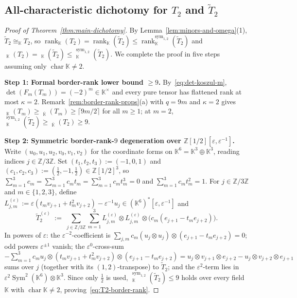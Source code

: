 \documentclass[11pt,reqno]{amsart}
\theoremstyle{definition}
\theoremstyle{remark}
\numberwithin{equation}{section}
\newcommand{\KK}{\mathbb{K}}
\newcommand{\ZZ}{\mathbb{Z}}
\DeclareMathOperator{\rk}{rank}
\DeclareMathOperator{\brk}{\underline{rank}}
\DeclareMathOperator{\Sym}{Sym}
\DeclareMathOperator{\chr}{char}
\begin{document}
\subsection{All-characteristic dichotomy for \texorpdfstring{$T_2$}{T2} and \texorpdfstring{$\widetilde{T}_2$}{T2-tilde}}

\begin{proof}[Proof of Theorem~\ref{thm:main-dichotomy}]
By Lemma~\ref{lem:minors-and-omega}(1), $\widetilde{T}_2 \cong_{\KK} T_2$, so $\rk_{\KK}(T_2) = \rk_{\KK}(\widetilde{T}_2) \le \rk_{\KK}^{\mathrm{sym}_{1,2}}(\widetilde{T}_2)$ and $\brk_{\KK}(T_2) = \brk_{\KK}(\widetilde{T}_2) \le \brk_{\KK}^{\mathrm{sym}_{1,2}}(\widetilde{T}_2)$. We complete the proof in five steps assuming only $\chr\KK \neq 2$.

\medskip
\noindent\textbf{Step 1: Formal border-rank lower bound $\ge 9$.}
By~\eqref{eq:det-koszul-m}, $\det(F_m(T_m)) = (-2)^m \in \KK^\times$ and every pure tensor has flattened rank at most $\kappa = 2$. Remark~\ref{rem:border-rank-props}(a) with $q = 9m$ and $\kappa = 2$ gives $\brk_{\KK}(T_m) \ge \brk_{\overline{\KK}}(T_m) \ge \lceil 9m/2 \rceil$ for all $m \ge 1$; at $m = 2$, $\brk_{\KK}^{\mathrm{sym}_{1,2}}(\widetilde{T}_2) \ge \brk_{\overline{\KK}}(T_2) \ge 9$.

\medskip
\noindent\textbf{Step 2: Symmetric border-rank-$9$ degeneration over $\ZZ[1/2][\varepsilon, \varepsilon^{-1}]$.}
Write $(u_0, u_1, u_2, v_0, v_1, v_2)$ for the coordinate forms on $\KK^6 = \KK^3 \oplus \KK^3$, reading indices $j \in \ZZ/3\ZZ$. Set $(t_1, t_2, t_3) := (-1, 0, 1)$ and $(c_1, c_2, c_3) := (\frac{1}{2}, -1, \frac{1}{2}) \in \ZZ[1/2]^3$, so $\sum_{m=1}^3 c_m = \sum_{m=1}^3 c_m t_m = \sum_{m=1}^3 c_m t_m^3 = 0$ and $\sum_{m=1}^3 c_m t_m^2 = 1$. For $j \in \ZZ/3\ZZ$ and $m \in \{1, 2, 3\}$, define $L_{j,m}^{(\varepsilon)} := \varepsilon(t_m v_{j+1} + t_m^2 v_{j+2}) - \varepsilon^{-1} u_j \in (\KK^6)^*[\varepsilon, \varepsilon^{-1}]$ and
\[
  \widetilde{T}_2^{(\varepsilon)} \;:=\; \sum_{j \in \ZZ/3\ZZ} \sum_{m=1}^3 L_{j,m}^{(\varepsilon)} \otimes L_{j,m}^{(\varepsilon)} \otimes \bigl(c_m(e_{j+1} - t_m e_{j+2})\bigr).
\]
In powers of $\varepsilon$: the $\varepsilon^{-2}$-coefficient is $\sum_{j,m} c_m (u_j \otimes u_j) \otimes (e_{j+1} - t_m e_{j+2}) = 0$; odd powers $\varepsilon^{\pm 1}$ vanish; the $\varepsilon^0$-cross-sum $-\sum_{m=1}^3 c_m u_j \otimes (t_m v_{j+1} + t_m^2 v_{j+2}) \otimes (e_{j+1} - t_m e_{j+2}) = u_j \otimes v_{j+1} \otimes e_{j+2} - u_j \otimes v_{j+2} \otimes e_{j+1}$ sums over $j$ (together with its $(1,2)$-transpose) to $\widetilde{T}_2$; and the $\varepsilon^2$-term lies in $\varepsilon^2 \Sym^2(\KK^6) \otimes \KK^3$. Since only $\frac{1}{2}$ is used, $\brk_{\KK}^{\mathrm{sym}_{1,2}}(\widetilde{T}_2) \le 9$ holds over every field $\KK$ with $\chr\KK \neq 2$, proving~\eqref{eq:T2-border-rank}.


\end{proof}
\end{document}
